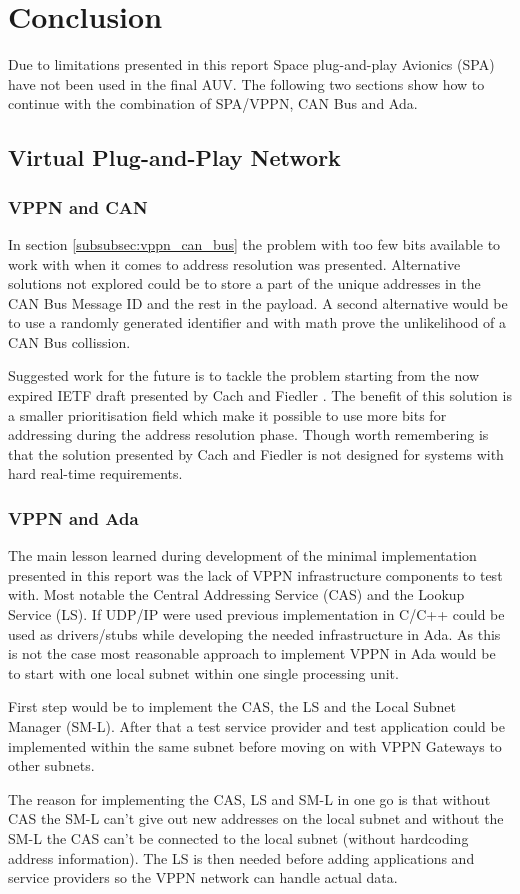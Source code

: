 \section{Conclusion}\label{sec:conclusion}
Due to limitations presented in this report Space plug-and-play Avionics (SPA) have
not been used in the final AUV. The following two sections show how to continue
with the combination of SPA/VPPN, CAN Bus and Ada.

\subsection{Virtual Plug-and-Play Network}
\subsubsection{VPPN and CAN}
In section \ref{subsubsec:vppn_can_bus} the problem with too few bits
available to work with when it comes to address resolution was presented.
Alternative solutions not explored could be to store a part of the unique
addresses in the CAN Bus Message ID and the rest in the payload. A second
alternative would be to use a randomly generated identifier and with math
prove the unlikelihood of a CAN Bus collission.

Suggested work for the future is to tackle the problem starting from the now
expired IETF draft presented by Cach and Fiedler \cite{web:draft-ip_over_can}.
The benefit of this solution is a
smaller prioritisation field which make it possible to use more bits for
addressing during the address resolution phase. Though worth remembering is
that the solution presented by Cach and Fiedler is not designed for systems
with hard real-time requirements.

\subsubsection{VPPN and Ada}
The main lesson learned during development of the minimal implementation
presented in this report was the lack of VPPN infrastructure
components to test with. Most notable the Central Addressing Service (CAS) and the
Lookup Service (LS). If UDP/IP were used previous implementation in C/C++ could be
used as drivers/stubs while developing the needed infrastructure in Ada. As
this is not the case most reasonable approach to implement VPPN in Ada would
be to start with one local subnet within one single processing unit.

First step would be to implement the CAS, the LS and the Local Subnet Manager (SM-L).
After that a test service provider and test application could be implemented
within the same subnet before moving on with VPPN Gateways to other subnets.

The reason for implementing the CAS, LS and SM-L in one go is
that without CAS the SM-L can't give out new addresses on the local subnet and
without the SM-L the CAS can't be connected to the local subnet (without
hardcoding address information). The LS is then needed before adding
applications and service providers so the VPPN network can handle actual data.
